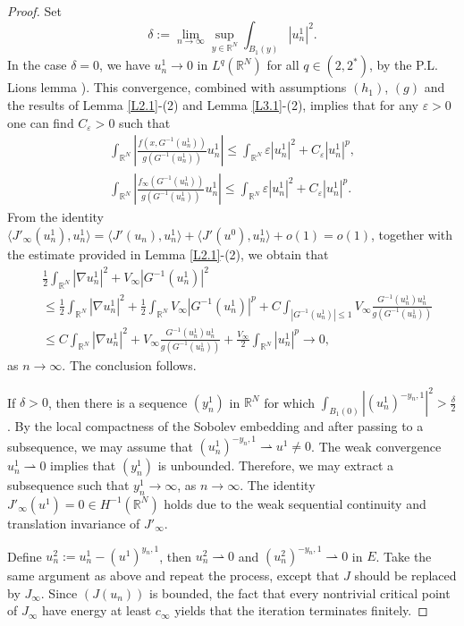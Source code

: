 \documentclass[reqno]{amsart}
\begin{document}
\begin{proof}
Set
$$
\delta:=\lim_{n\to\infty}\sup_{y\in{\mathbb{R}^N}}\int_{B_1(y)}|u^1_n|^2.
$$
In the case $\delta = 0$, we  have \(u^1_n \to 0\) in \(L^q(\mathbb{R}^N)\) for all 
\(q \in (2, 2^*)\), by the P.L. Lions lemma \cite[Lemma 1.21 ]{Willem}). 
This convergence, combined with assumptions \((h_1)\), \((g)\) and the results of 
Lemma \ref{L2.1}-(2) and Lemma \ref{L3.1}-(2), implies that for any \(\varepsilon >0\) 
one can find \(C_{\varepsilon}>0\) such that 
\begin{gather*}
\int_{\mathbb{R}^N}|\frac{f(x,G^{-1}(u^1_n))}{g(G^{-1}(u^1_n))}u^1_n|\leq\int_{\mathbb{R}^N}\varepsilon|u^1_n|^2+C_\varepsilon|u^1_n|^p,
\\
\int_{\mathbb{R}^N}|\frac{f_\infty(G^{-1}(u^1_n))}{g(G^{-1}(u^1_n))}u^1_n|\leq\int_{\mathbb{R}^N}\varepsilon|u^1_n|^2+C_\varepsilon|u^1_n|^p.
\end{gather*}
From the identity $\langle J'_\infty(u^1_n),u^1_n\rangle=\langle J'(u_n),u^1_n\rangle+\langle J'(u^0),u^1_n\rangle+o(1)=o(1)$, 
together with the estimate provided in Lemma \ref{L2.1}-(2), we obtain that
\begin{align*}
&\frac{1}{2}\int_{\mathbb{R}^N}|\nabla u^1_n|^2+V_\infty|G^{-1}(u^1_n)|^2 \\
&\leq \frac{1}{2}\int_{\mathbb{R}^N}|\nabla u^1_n|^2+\frac{1}{2}\int_{\mathbb{R}^N}V_\infty|G^{-1}(u^1_n)|^p
 +C\int_{|G^{-1}(u^1_n)|\leq1}V_\infty\frac{G^{-1}(u^1_n)u^1_n}{g(G^{-1}(u^1_n))}\\
&\leq C\int_{\mathbb{R}^N}|\nabla u^1_n|^2+V_\infty\frac{G^{-1}(u^1_n)u^1_n}{g(G^{-1}(u^1_n))}
 +\frac{V_\infty}{2}\int_{\mathbb{R}^N}|u^1_n|^p \to  0,
\end{align*}
as $n\to\infty$. The conclusion follows.

If $\delta>0$, then there is a sequence \((y^1_n)\) in \(\mathbb{R}^N\) for which 
$\int_{B_1(0)}|(u^1_n)^{-y_n,1}|^2>\frac{\delta}{2}$. By the local compactness of the 
Sobolev embedding and after passing to a subsequence, we may assume that 
$(u^1_n)^{-y_n,1} \rightharpoonup u^1\neq0$. The weak convergence 
$u^1_n \rightharpoonup 0$ implies that $(y^1_n)$ is unbounded. Therefore, we may extract a subsequence such that $y^1_n \to \infty$, as $n \to \infty$. 
The identity $J'_\infty(u^1)=0\in H^{-1}({\mathbb{R}^N})$  holds due to the weak sequential continuity 
and translation invariance of $J'_\infty$. 

Define $u^2_n:=u^1_n-(u^1)^{y_n,1}$, then $u^2_n \rightharpoonup 0$ and 
$(u^2_n)^{-y_n,1} \rightharpoonup 0$ in $E$. Take the same argument as above and repeat 
the process, except that $J$ should be replaced by $J_\infty$.  
Since $(J(u_n))$ is bounded, the fact that every nontrivial critical point of $J_\infty$  have 
energy at least  $c_\infty$ yields that the iteration terminates finitely.
\end{proof}
\end{document}
